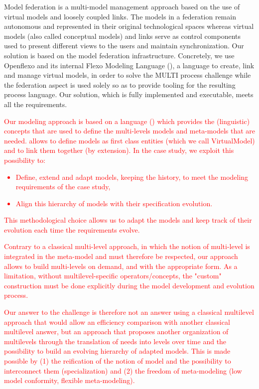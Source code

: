 Model federation is a multi-model management approach based on the use of virtual models and loosely coupled links. The models in a federation remain autonomous and represented in their original technological spaces whereas virtual models (also called conceptual models) and links serve as control components used to present different views to the users and maintain synchronization.
Our solution is based on the model federation infrastructure. Concretely, we use Openflexo and its internal Flexo Modeling Language (\FML), a language to create, link and manage virtual models, in order to solve the MULTI process challenge while the federation aspect is used solely so as to provide tooling for the resulting process language. Our solution, which is fully implemented and executable, meets all the requirements.

\textcolor{red}{Our modeling approach is based on a language (\FML) which provides the (linguistic) concepts that are used to define  the multi-levels models and meta-models that are needed. \FML allows to define models as first class entities (which we call VirtualModel) and to link them together (by extension). In the \mpc case study, we exploit this possibility to:
\begin{itemize}
    \item Define, extend and adapt models, keeping the history, to meet {\color{blue}the} %
    modeling requirements of the case study,
    \item Align this hierarchy of models with their specification evolution.
\end{itemize}
This methodological choice allows us to adapt the models and keep track of their evolution each time the requirements evolve.}

\textcolor{red}{Contrary to a classical multi-level approach, in which the notion of multi-level is integrated in the meta-model and must therefore be respected, our approach allows to build multi-levels on demand, and with the appropriate form. As a limitation, without multilevel-specific operators/concepts, the "custom" construction must be done explicitly during the model development and evolution process.}

\textcolor{red}{Our answer to the challenge is therefore not an answer using a classical multilevel approach that would allow an efficiency comparison with another classical multilevel answer, but an approach that proposes another organization of multilevels through the translation of needs into levels over time and the possibility to build an evolving hierarchy of adapted models. This is made possible by (1) the reification of the notion of model and the possibility to interconnect them (specialization) and (2) the freedom of meta-modeling (low model conformity, flexible meta-modeling).}

